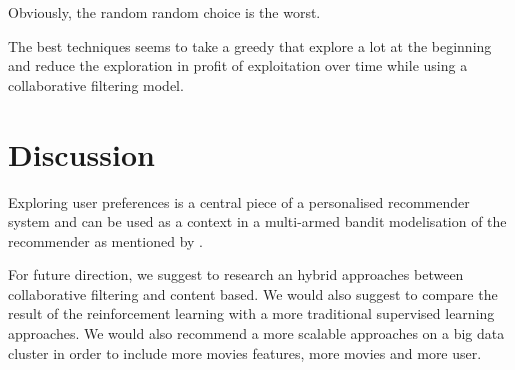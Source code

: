 \documentclass[letterpaper]{article}
\begin{document}
Obviously, the random random choice is the worst.

The best techniques seems to take a greedy that explore a lot at the beginning and reduce the exploration in profit of exploitation over time while using a collaborative filtering model.

\section{Discussion}

Exploring user preferences is a central piece of a personalised recommender system and can be used as a context in a multi-armed bandit modelisation of the recommender as mentioned by \cite{main}.










For future direction, we suggest to research an hybrid approaches between collaborative filtering and content based. We would also suggest to compare the result of the reinforcement learning with a more traditional supervised learning approaches. We would also recommend a more scalable approaches on a big data cluster in order to include more movies features, more movies and more user.
\end{document}
